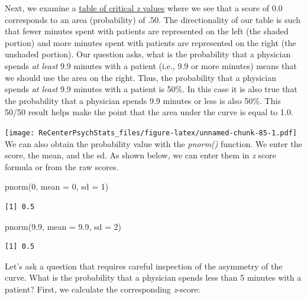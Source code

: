 \documentclass[
  11pt,
]{book}
\newenvironment{Shaded}{\begin{snugshade}}{\end{snugshade}}
\newcommand{\AttributeTok}[1]{\textcolor[rgb]{0.77,0.63,0.00}{#1}}
\newcommand{\DecValTok}[1]{\textcolor[rgb]{0.00,0.00,0.81}{#1}}
\newcommand{\FloatTok}[1]{\textcolor[rgb]{0.00,0.00,0.81}{#1}}
\newcommand{\FunctionTok}[1]{\textcolor[rgb]{0.00,0.00,0.00}{#1}}
\newcommand{\NormalTok}[1]{#1}
\begin{document}
Next, we examine a \href{https://www.statology.org/z-table/}{table of critical \emph{z} values} where we see that a score of 0.0 corresponds to an area (probability) of .50. The directionality of our table is such that fewer minutes spent with patients are represented on the left (the shaded portion) and more minutes spent with patients are represented on the right (the unshaded portion). Our question asks, what is the probability that a physician spends \emph{at least} 9.9 minutes with a patient (i.e., 9.9 or more minutes) means that we should use the area on the right. Thus, the probability that a physician spends \emph{at least} 9.9 minutes with a patient is 50\%. In this case it is also true that the probability that a physician spends 9.9 minutes or less is also 50\%. This 50/50 result helps make the point that the area under the curve is equal to 1.0.

\texttt{[image: ReCenterPsychStats\_files/figure-latex/unnamed-chunk-85-1.pdf]}
We can also obtain the probability value with the \emph{pnorm()} function. We enter the score, the mean, and the sd. As shown below, we can enter them in \emph{z} score formula or from the raw scores.

\begin{Shaded}
\begin{Highlighting}[]
\FunctionTok{pnorm}\NormalTok{(}\DecValTok{0}\NormalTok{, }\AttributeTok{mean =} \DecValTok{0}\NormalTok{, }\AttributeTok{sd =} \DecValTok{1}\NormalTok{)}
\end{Highlighting}
\end{Shaded}

\begin{verbatim}
[1] 0.5
\end{verbatim}

\begin{Shaded}
\begin{Highlighting}[]
\FunctionTok{pnorm}\NormalTok{(}\FloatTok{9.9}\NormalTok{, }\AttributeTok{mean =} \FloatTok{9.9}\NormalTok{, }\AttributeTok{sd =} \DecValTok{2}\NormalTok{)}
\end{Highlighting}
\end{Shaded}

\begin{verbatim}
[1] 0.5
\end{verbatim}

Let's ask a question that requires careful inspection of the asymmetry of the curve. What is the probability that a physician spends less than 5 minutes with a patient? First, we calculate the corresponding \emph{z}-score:
\end{document}
